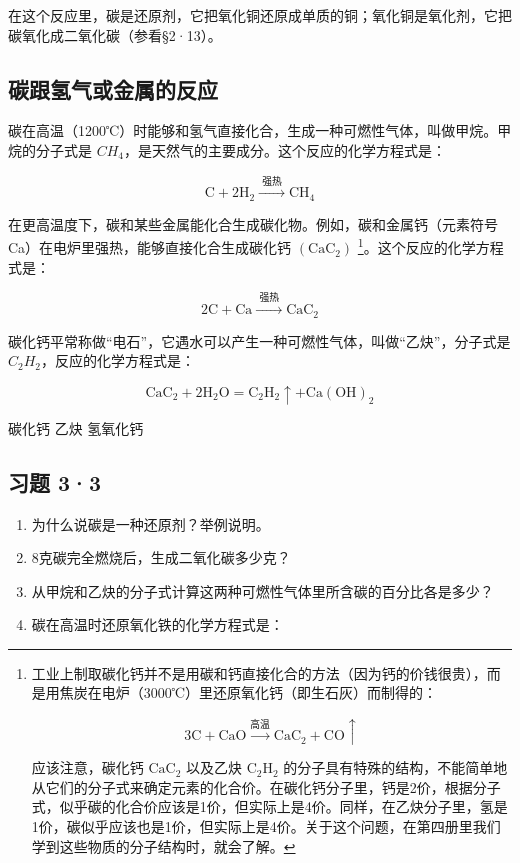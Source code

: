 在这个反应里，碳是还原剂，它把氧化铜还原成单质的铜；氧化铜是氧化剂，它把碳氧化成二氧化碳（参看§2·13）。

\subsection{碳跟氢气或金属的反应}

碳在高温（1200℃）时能够和氢气直接化合，生成一种可燃性气体，叫做甲烷。甲烷的分子式是
\(CH_{4}\)，是天然气的主要成分。这个反应的化学方程式是：

\[
\mathrm{C} + 2 \mathrm{H}_{2} \xrightarrow {\text{ 强热 }} \mathrm{CH}_{4}
\]

在更高温度下，碳和某些金属能化合生成碳化物。例如，碳和金属钙（元素符号
Ca）在电炉里强热，能够直接化合生成碳化钙
\(\left(\mathrm{CaC}_{2}\right)\) \footnote{工业上制取碳化钙并不是用碳和钙直接化合的方法（因为钙的价钱很贵），而是用焦炭在电炉（3000℃）里还原氧化钙（即生石灰）而制得的：

  \[
  3\mathrm{C}+\mathrm{CaO}\xrightarrow{\text{高温}}\mathrm{CaC}_{2}+\mathrm{CO}\uparrow
  \]

  应该注意，碳化钙 \(\mathrm{CaC}_{2}\) 以及乙炔
  \(\mathrm{C}_{2}\mathrm{H}_{2}\)
  的分子具有特殊的结构，不能简单地从它们的分子式来确定元素的化合价。在碳化钙分子里，钙是2价，根据分子式，似乎碳的化合价应该是1价，但实际上是4价。同样，在乙炔分子里，氢是1价，碳似乎应该也是1价，但实际上是4价。关于这个问题，在第四册里我们学到这些物质的分子结构时，就会了解。}。这个反应的化学方程式是：

\[
2 \mathrm{C} + \mathrm{Ca} \xrightarrow {\text{ 强热 }} \mathrm{CaC}_{2}
\]

碳化钙平常称做``电石''，它遇水可以产生一种可燃性气体，叫做``乙炔''，分子式是
\(C_{2}H_{2}\)，反应的化学方程式是：

\[
\mathrm{CaC}_{2} + 2 \mathrm{H}_{2} \mathrm{O} = \mathrm{C}_{2} \mathrm{H}_{2} \uparrow + \mathrm{Ca(OH)}_{2}
\]

碳化钙 乙炔 氢氧化钙

\subsection{习题 3·3}

\begin{enumerate}
\item
  为什么说碳是一种还原剂？举例说明。
\item
  8克碳完全燃烧后，生成二氧化碳多少克？
\item
  从甲烷和乙炔的分子式计算这两种可燃性气体里所含碳的百分比各是多少？
\item
  碳在高温时还原氧化铁的化学方程式是：
\end{enumerate}

